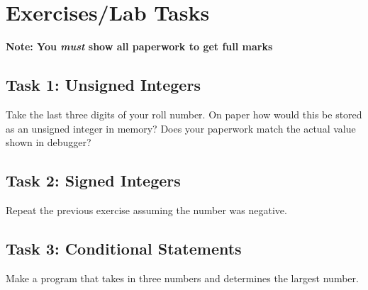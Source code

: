 \documentclass[12pt,a4paper]{article}
\begin{document}
\section{Exercises/Lab Tasks}
\textbf{Note: You \emph{must} show all paperwork to get full marks}
\subsection{Task 1: Unsigned Integers}
Take the last three digits of your roll number. On paper how would this be stored as an unsigned integer in memory? Does your paperwork match the actual value shown in debugger?
\subsection{Task 2: Signed Integers}
Repeat the previous exercise assuming the number was negative.
\subsection{Task 3: Conditional Statements}
Make a program that takes in three numbers and determines the largest number.
\end{document}

